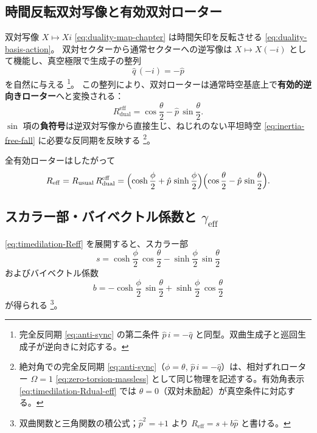 \documentclass[dvipdfmx,a4paper,oneside]{jsbook}
\numberwithin{equation}{chapter}
\begin{document}
\subsection{時間反転双対写像と有効双対ローター}

双対写像 \(X \mapsto Xi\) \eqref{eq:duality-map-chapter} は時間矢印を反転させる \eqref{eq:duality-basis-action}。
双対セクターから通常セクターへの逆写像は \(X \mapsto X(-i)\) として機能し、真空極限で生成子の整列
\begin{equation}
  \hat{q}\,(-i) = -\hat{p}
  \label{eq:timedilation-q-alignment}
\end{equation}
を自然に与える \footnote{完全反同期 \eqref{eq:anti-sync} の第二条件 \(\hat{p}\, i = -\hat{q}\) と同型。双曲生成子と巡回生成子が逆向きに対応する。}。
この整列により、双対ローターは通常時空基底上で\textbf{有効的逆向きローター}へと変換される：
\begin{equation}
  R_{\mathrm{dual}}^{\mathrm{eff}}
  = \cos\frac{\theta}{2} - \hat{p}\,\sin\frac{\theta}{2}.
  \label{eq:timedilation-Rdual-eff}
\end{equation}
\(\sin\) 項の\textbf{負符号}は逆双対写像から直接生じ、ねじれのない平坦時空 \eqref{eq:inertia-free-fall} に必要な反同期を反映する \footnote{絶対角での完全反同期 \eqref{eq:anti-sync}（\(\phi = \theta\), \(\hat{p}\, i = -\hat{q}\)）は、相対ずれローター \(\Omega = 1\) \eqref{eq:zero-torsion-massless} として同じ物理を記述する。有効角表示 \eqref{eq:timedilation-Rdual-eff} では \(\theta = 0\)（双対未励起）が真空条件に対応する。}。

全有効ローターはしたがって
\begin{equation}
  R_{\mathrm{eff}}
  = R_{\mathrm{usual}}\, R_{\mathrm{dual}}^{\mathrm{eff}}
  = \Bigl(\cosh\frac{\phi}{2} + \hat{p}\,\sinh\frac{\phi}{2}\Bigr)
    \Bigl(\cos\frac{\theta}{2} - \hat{p}\,\sin\frac{\theta}{2}\Bigr).
  \label{eq:timedilation-Reff}
\end{equation}

\subsection{スカラー部・バイベクトル係数と \(\gamma_{\mathrm{eff}}\)}

\eqref{eq:timedilation-Reff} を展開すると、スカラー部
\begin{equation}
  s = \cosh\frac{\phi}{2}\,\cos\frac{\theta}{2}
    - \sinh\frac{\phi}{2}\,\sin\frac{\theta}{2}
  \label{eq:timedilation-s}
\end{equation}
およびバイベクトル係数
\begin{equation}
  b = -\cosh\frac{\phi}{2}\,\sin\frac{\theta}{2}
    + \sinh\frac{\phi}{2}\,\cos\frac{\theta}{2}
  \label{eq:timedilation-b}
\end{equation}
が得られる \footnote{双曲関数と三角関数の積公式；\(\hat{p}^2 = +1\) より \(R_{\mathrm{eff}} = s + b\hat{p}\) と書ける。}。
\end{document}
